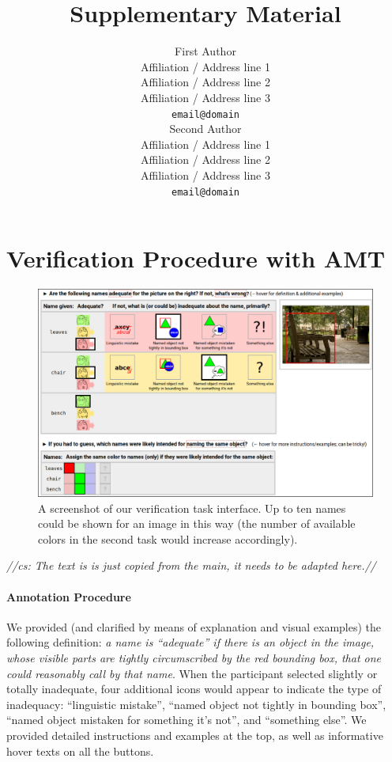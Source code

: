 \documentclass[11pt,a4paper]{article}
\title{Supplementary Material}
\author{First Author \\
	Affiliation / Address line 1 \\
	Affiliation / Address line 2 \\
	Affiliation / Address line 3 \\
	\texttt{email@domain} \\\And
	Second Author \\
	Affiliation / Address line 1 \\
	Affiliation / Address line 2 \\
	Affiliation / Address line 3 \\
	\texttt{email@domain} \\}
\date{}
\newcommand{\cs}[1]{\textcolor{green!60!black}{\emph{//cs: #1//}}}
\begin{document}
\section{Verification Procedure with AMT}
\label{sec:verif}
\begin{figure}[t]
	\centering
	\includegraphics[width=\textwidth]{images/verification-interface.pdf}
	\caption{A screenshot of our verification task interface. Up to ten names could be shown for an image in this way (the number of available colors in the second task would increase accordingly).}
	\label{fig:verification-interface}
\end{figure}

\cs{The text is is just copied from the main, it needs to be adapted here.}
\paragraph{Annotation Procedure}
We provided (and clarified by means of explanation and visual examples) the following definition: \textit{a name is ``adequate'' if there is an object in the image, whose visible parts are tightly circumscribed by the red bounding box, that one could reasonably call by that name}.
When the participant selected slightly or totally inadequate, four additional icons would appear to indicate the type of inadequacy: ``linguistic mistake'', ``named object not tightly in bounding box'', ``named object mistaken for something it's not'', and ``something else''.
We provided detailed instructions and examples at the top, as well as informative hover texts on all the buttons.
\end{document}
